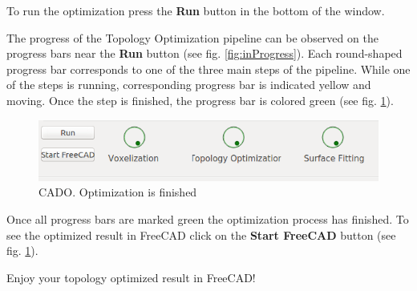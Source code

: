 \documentclass[
12pt, %
a4paper, %
oneside, %
headinclude,footinclude, %
BCOR5mm, %
]{scrartcl}
\begin{document}
To run the optimization press the \textbf{Run} button in the bottom of the window.

The progress of the Topology Optimization pipeline can be observed on the progress bars near the \textbf{Run} button (see fig. \ref{fig:inProgress}). Each round-shaped progress bar corresponds to one of the three main steps of the pipeline. While one of the steps is running, corresponding progress bar is indicated yellow and moving. Once the step is finished, the progress bar is colored green (see fig. \ref{fig:progressBarsFinished}).

\begin{figure}
\centering
\includegraphics[scale=0.4]{Pictures/progressBar_ready.png}
\caption{CADO. Optimization is finished}
\label{fig:progressBarsFinished}
\end{figure}

Once all progress bars are marked green the optimization process has finished. To see the optimized result in FreeCAD click on the \textbf{Start FreeCAD} button (see fig. \ref{fig:progressBarsFinished}).

Enjoy your topology optimized result in FreeCAD!
\end{document}
